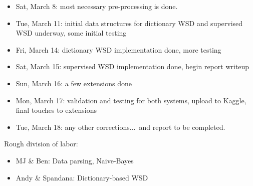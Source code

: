 \documentclass{article}
\begin{document}
\begin{itemize}[noitemsep,nolistsep]
\item Sat, March 8: most necessary pre-processing is done.
\item Tue, March 11: initial data structures for dictionary WSD and supervised WSD underway, some initial testing
\item Fri, March 14: dictionary WSD implementation done, more testing
\item Sat, March 15: supervised WSD implementation done, begin report writeup
\item Sun, March 16: a few extensions done
\item Mon, March 17: validation and testing for both systems, upload to Kaggle, final touches to extensions
\item Tue, March 18: any other corrections...\ and report to be completed.
\end{itemize}

Rough division of labor:
\begin{itemize}[noitemsep,nolistsep]
\item MJ \& Ben: Data parsing, Naive-Bayes
\item Andy \& Spandana: Dictionary-based WSD
\end{itemize}
\end{document}
